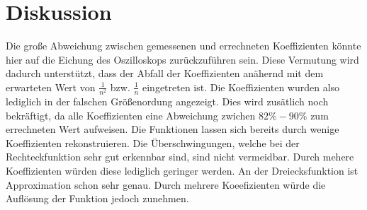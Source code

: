 \section{Diskussion}
\label{sec:Diskussion}
Die große Abweichung zwischen gemessenen und errechneten Koeffizienten könnte hier auf die Eichung des Oszilloskops zurückzuführen sein.
Diese Vermutung wird dadurch unterstützt, dass der Abfall der Koeffizienten anähernd mit dem erwarteten Wert von $\frac{1}{n^2}$ bzw. $\frac{1}{n}$ eingetreten ist.
Die Koeffizienten wurden also lediglich in der falschen Größenordung angezeigt.
Dies wird zusätlich noch bekräftigt, da alle Koeffizienten eine Abweichung zwichen $82\%-90\%$ zum errechneten Wert aufweisen.
Die Funktionen lassen sich bereits durch wenige Koeffizienten rekonstruieren. Die Überschwingungen, welche bei der Rechteckfunktion sehr gut erkennbar sind, sind nicht vermeidbar.
Durch mehere Koeffizienten würden diese lediglich geringer werden.
An der Dreiecksfunktion ist Approximation schon sehr genau.
Durch mehrere Koeefizienten würde die Auflösung der Funktion jedoch zunehmen. 
